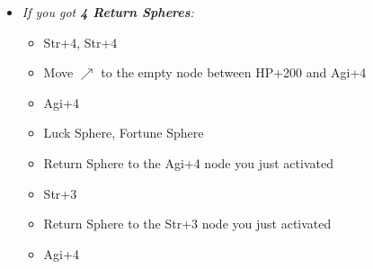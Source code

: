 \begin{spheregrid}
    \begin{itemize}
        \yunaf
        \begin{itemize}
            \item \textit{If you got \textbf{4 Return Spheres}:}
            \begin{itemize}
                \yunaf Friend Sphere to \lulu\ $\downarrow\downarrow$
                \item Str+4, Str+4
                \item Move $\nearrow$ to the empty node between HP+200 and Agi+4
                \item Agi+4
                \item Luck Sphere, Fortune Sphere
                \item Return Sphere to the Agi+4 node you just activated
                \item Str+3
                \item Return Sphere to the Str+3 node you just activated
                \item Agi+4
            \end{itemize}

\end{itemize}
\end{itemize}
\end{spheregrid}
